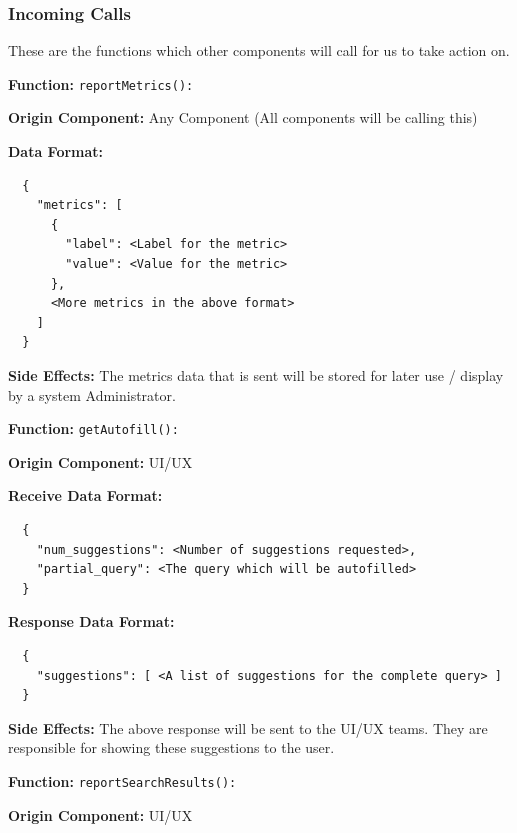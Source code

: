\newpage
\subsubsection*{Incoming Calls}
These are the functions which other components will call for us to take action on.

\medskip

\textbf{Function:} \verb|reportMetrics():|

\smallskip

\textbf{Origin Component:} Any Component (All components will be calling this)

\smallskip

\textbf{Data Format:} \begin{verbatim}
  {
    "metrics": [
      {
        "label": <Label for the metric>
        "value": <Value for the metric>
      },
      <More metrics in the above format>
    ]
  }
\end{verbatim}

\smallskip

\textbf{Side Effects:} The metrics data that is sent will be stored for later use / display by a system Administrator.

\bigskip

\textbf{Function:} \verb|getAutofill():|

\smallskip

\textbf{Origin Component:} UI/UX

\smallskip

\textbf{Receive Data Format:} \begin{verbatim}
  {
    "num_suggestions": <Number of suggestions requested>,
    "partial_query": <The query which will be autofilled>
  }
\end{verbatim}

\textbf{Response Data Format:} \begin{verbatim}
  {
    "suggestions": [ <A list of suggestions for the complete query> ]
  }
\end{verbatim}

\smallskip

\textbf{Side Effects:} The above response will be sent to the UI/UX teams. They are responsible for showing these suggestions to the user.

\bigskip

\textbf{Function:} \verb|reportSearchResults():|

\smallskip

\textbf{Origin Component:} UI/UX

